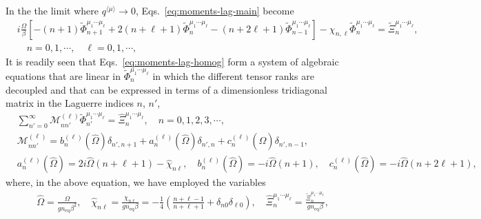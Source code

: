 \documentclass[aps,prd,preprint,nofootinbib,amsmath,amssymb,showpacs,longbibliography,singlecolumn,superscriptaddress,10pt]{revtex4-1}
\theoremstyle{plain}
\theoremstyle{definition}
\begin{document}
In the the limit where $q^{\langle \mu \rangle} \to 0$,    Eqs.~\eqref{eq:moments-lag-main} become
%
\begin{equation}
\label{eq:moments-lag-homog}
\begin{aligned}
&
i \frac{\Omega}{\beta} \left[
-(n+1) \widetilde{\Phi}_{n+1}^{\mu_{1} \cdots \mu_{\ell}}
+
2(n+\ell+1)
\widetilde{\Phi}_{n}^{\mu_{1} \cdots \mu_{\ell}}
-
(n+2\ell+1)
\widetilde{\Phi}_{n-1}^{\mu_{1} \cdots \mu_{\ell}}
\right]
-
\chi_{n,\ell}
\widetilde{\Phi}_{n}^{\mu_{1} \cdots \mu_{\ell}}
   = 
\widetilde{\Xi}_{n}^{\mu_{1} \cdots \mu_{\ell}},
\\
&
\quad n = 0, 1, \cdots, \quad \ell = 0, 1, \cdots,
\end{aligned}
\end{equation}
%
It is readily seen that Eqs.~\eqref{eq:moments-lag-homog} form a system of algebraic equations that are linear in $\widetilde{\Phi}_{n}^{\mu_{1} \cdots \mu_{\ell}}$ in which the different tensor ranks are decoupled and that can be expressed in terms of a dimensionless tridiagonal matrix in the Laguerre indices $n$, $n'$,
%
\begin{equation}
\label{eq:homogeneous-main}
\begin{aligned}
&
\sum_{n'=0}^{\infty}\mathcal{M}_{n n'}^{(\ell)} \widetilde{\Phi}_{n'}^{\mu_{1} \cdots \mu_{\ell}}
=
\widehat{\Xi}_{n}^{\mu_{1} \cdots \mu_{\ell}},
\quad
n = 0,1,2,3, \cdots,
\\
&
\mathcal{M}_{n n'}^{(\ell)} = 
b_{n}^{(\ell)}(\widehat{\Omega})
\delta_{n',n+1}
+
a_{n}^{(\ell)}(\widehat{\Omega})
\delta_{n',n}
+
c_{n}^{(\ell)}(\widehat{\Omega})
\delta_{n',n-1}, \\
&
a_{n}^{(\ell)}(\widehat{\Omega}) = 2 i \widehat{\Omega} (n+\ell+1)
-
\widehat{\chi}_{n\ell},
\quad
b_{n}^{(\ell)}(\widehat{\Omega}) = - i \widehat{\Omega} (n+1),
\quad
c_{n}^{(\ell)}(\widehat{\Omega}) = - i \widehat{\Omega} (n+2\ell+1), 
\end{aligned}    
\end{equation}
%
where, in the above equation, we have employed the  variables 
%
\begin{equation}
\label{eq:Omega-Q2-defs-homog}
\begin{aligned}
&
\widehat{\Omega} = \frac{\Omega}{g n_{\mathrm{eq}} \beta^{2}},
\quad
\widehat{\chi}_{n \ell} = \frac{\chi_{n \ell}}{g n_{\mathrm{eq}} \beta} = -\frac{1}{4}\left(\frac{n + \ell -1}{n+\ell+1} + \delta_{n 0} \delta_{\ell 0}\right),
\quad
\widehat{\Xi}_{n}^{\mu_{1} \cdots \mu_{\ell}} = \frac{\widetilde{\Xi}_{n}^{\mu_{1} \cdots \mu_{\ell}}}{g n_{\mathrm{eq}} \beta},
\end{aligned}    
\end{equation}
\end{document}
